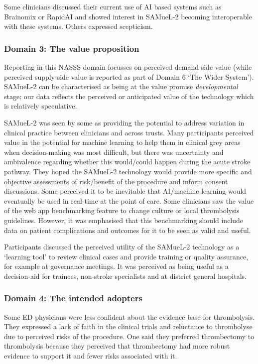 Some clinicians discussed their current use of AI based systems such as Brainomix or RapidAI and showed interest in SAMueL-2 becoming interoperable with these systems. Others expressed scepticism.

\subsubsection{Domain 3: The value proposition}

Reporting in this NASSS domain focusses on perceived demand-side value (while perceived supply-side value is reported as part of Domain 6 ‘The Wider System’). SAMueL-2 can be characterised as being at the value promise \textit{developmental} stage; our data reflects the perceived or anticipated value of the technology which is relatively speculative.

SAMueL-2 was seen by some as providing the potential to address variation in clinical practice between clinicians and across trusts. Many participants perceived value in the potential for machine learning to help them in clinical grey areas when decision-making was most difficult, but there was uncertainty and ambivalence regarding whether this would/could happen during the acute stroke pathway. They hoped the SAMueL-2 technology would provide more specific and objective assessments of risk/benefit of the procedure and inform consent discussions. Some perceived it to be inevitable that AI/machine learning would eventually be used in real-time at the point of care. Some clinicians saw the value of the web app benchmarking feature to change culture or local thrombolysis guidelines. However, it was emphasised that this benchmarking should include data on patient complications and outcomes for it to be seen as valid and useful.

Participants discussed the perceived utility of the SAMueL-2 technology as a ‘learning tool’ to review clinical cases and provide training or quality assurance, for example at governance meetings. It was perceived as being useful as a decision-aid for trainees, non-stroke specialists and at district general hospitals.

\subsubsection{Domain 4: The intended adopters}

Some ED physicians were less confident about the evidence base for thrombolysis. They expressed a lack of faith in the clinical trials and reluctance to thrombolyse due to perceived risks of the procedure. One said they preferred thrombectomy to thrombolysis because they perceived that thrombectomy had more robust evidence to support it and fewer risks associated with it.

